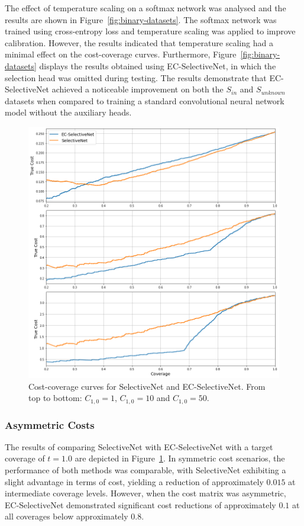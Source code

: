 
The effect of temperature scaling on a softmax network was analysed and the results are shown in Figure~\ref{fig:binary-datasets}. The softmax network was trained using cross-entropy loss and temperature scaling was applied to improve calibration. However, the results indicated that temperature scaling had a minimal effect on the cost-coverage curves. Furthermore, Figure~\ref{fig:binary-datasets} displays the results obtained using EC-SelectiveNet, in which the selection head was omitted during testing. The results demonstrate that EC-SelectiveNet achieved a noticeable improvement on both the $S_{in}$ and $S_{unknown}$ datasets when compared to training a standard convolutional neural network model without the auxiliary heads.

\begin{figure}[!h]
	\centering
	\includegraphics[width=\textwidth]{images/binary_ecselectivenet.png}
	\caption{Cost-coverage curves for SelectiveNet and EC-SelectiveNet. From top to bottom: $C_{1,0}=1$, $C_{1,0}=10$ and $C_{1,0}=50$.}
	\label{fig:binary-ecselectivenet}
\end{figure}

\subsubsection{Asymmetric Costs}
The results of comparing SelectiveNet with EC-SelectiveNet with a target coverage of $t=1.0$ are depicted in Figure~\ref{fig:binary-ecselectivenet}. In symmetric cost scenarios, the performance of both methods was comparable, with SelectiveNet exhibiting a slight advantage in terms of cost, yielding a reduction of approximately $0.015$ at intermediate coverage levels. However, when the cost matrix was asymmetric, EC-SelectiveNet demonstrated significant cost reductions of approximately $0.1$ at all coverages below approximately $0.8$.

